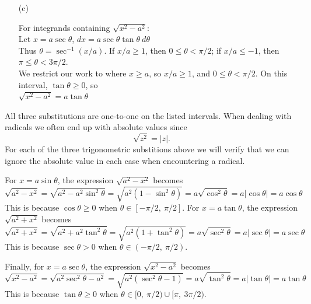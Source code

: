 \begin{formulabox}
\begin{enumerate}
	\item[(c)] \noindent
	\begin{minipage}[t]{.6\linewidth}
		For integrands containing $\sqrt{x^2-a^2}$:\\[5pt]
		Let $x=a\sec\theta$, \qquad $dx = a\sec\theta\tan\theta\ d\theta$\\[5pt]	
	Thus $\theta = \sec^{-1}(x/a)$. If $x/a\geq 1$, then $0\leq\theta<\pi/2$; if $x/a \leq -1$, then $\pi\le\theta< 3\pi/2$.\\[5pt]	
	We restrict our work to where $x\geq a$, so $x/a\geq 1$, and $0\leq\theta<\pi/2$.
	On this interval, $\tan\theta\geq 0$, so\\[5pt]	
	$\sqrt{x^2-a^2} = a\tan\theta$
		\end{minipage}\qquad
	\begin{minipage}[t]{.4\linewidth}\vskip 0pt
		\end{minipage}	
\end{enumerate}

\end{formulabox}

All three substitutions are one-to-one on the listed intervals.
When dealing with radicals we often end up with absolute values since
$$\sqrt{z^2}=|z|.$$
For each of the three trigonometric substitions above we will verify that we can ignore the absolute value in each case when encountering a radical.

For $x=a\sin\theta$, the expression $\sqrt{a^2-x^2}$ becomes
$$\sqrt{a^2-x^2}
= \sqrt{a^2-a^2\sin^2\theta}
= \sqrt{a^2(1-\sin^2\theta)}
= a\sqrt{\cos^2\theta}
= a|\cos\theta|
= a\cos\theta$$ 
This is because $\cos\theta\geq 0$ when $\theta\in[-\pi/2,~\pi/2]$. 
For $x=a\tan\theta$, the expression $\sqrt{a^2+x^2}$ becomes
$$\sqrt{a^2+x^2}
= \sqrt{a^2+a^2\tan^2\theta}
= \sqrt{a^2(1+\tan^2\theta)}
= a\sqrt{\sec^2\theta}
= a|\sec\theta|
= a\sec\theta$$ 
This is because $\sec\theta>0$ when $\theta\in(-\pi/2,~\pi/2)$. 

Finally, for $x=a\sec\theta$, the expression $\sqrt{x^2-a^2}$ becomes
$$\sqrt{x^2-a^2}
= \sqrt{a^2\sec^2\theta-a^2}
= \sqrt{a^2(\sec^2\theta-1)}
= a\sqrt{\tan^2\theta}
= a|\tan\theta|
= a\tan\theta$$
This is because $\tan\theta\geq 0$ when $\theta\in[0,~\pi/2)\cup[\pi,~3\pi/2)$. 

